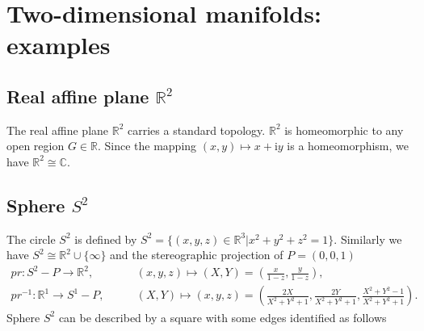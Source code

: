 \documentclass{report}
\begin{document}
\section{Two-dimensional manifolds: examples}
\subsection{Real affine plane $\mathbb{R}^2$}
The real affine plane $\mathbb{R}^2$ carries a standard topology. $\mathbb{R}^2$ is homeomorphic to any open region $G\in\mathbb{R}$.
Since the mapping $(x,y)\mapsto x+\mathrm{i}y$ is a homeomorphism, we have $\mathbb{R}^2\cong \mathbb{C}$.

\subsection{Sphere $S^2$}
The circle $S^2$ is defined by $S^2=\{(x,y,z)\in\mathbb{R}^3|x^2+y^2+z^2=1\}$. Similarly we have $S^2\cong \mathbb{R}^2\cup\{\infty\}$ and the stereographic projection of $P=(0,0,1)$
\begin{align*}
	pr:S^2-P\longrightarrow \mathbb{R}^2,\qquad      & (x, y,z) \longmapsto (X,Y)=\left(\frac{x}{1-z}, \frac{y}{1-z}\right),                                                             \\
	pr^{-1}:\mathbb{R}^1\longrightarrow S^1-P,\qquad & (X,Y) \longmapsto(x, y,z)=\left(\frac{2 X}{X^{2}+Y^{2}+1}, \frac{2 Y}{X^{2}+Y^{2}+1}, \frac{X^{2}+Y^{2}-1}{X^{2}+Y^{2}+1}\right).
\end{align*}
Sphere $S^2$ can be described by a square with some edges identified as follows
\begin{center}
\end{center}
\end{document}
